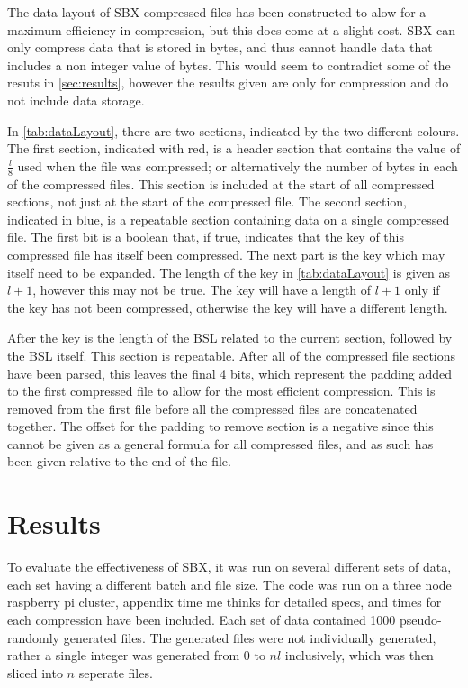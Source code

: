\documentclass{hehe}
\begin{document}
The data layout of SBX compressed files has been constructed to alow for a maximum efficiency in compression, but this does come at a slight cost. SBX can only compress data that is stored in bytes, and thus cannot handle data that includes a non integer value of bytes. This would seem to contradict some of the resuts in \autoref{sec:results}, however the results given are only for compression and do not include data storage.

In \cref{tab:dataLayout}, there are two sections, indicated by the two different colours. The first section, indicated with red, is a header section that contains the value of $\frac{l}{8}$ used when the file was compressed; or alternatively the number of bytes in each of the compressed files. This section is included at the start of all compressed sections, not just at the start of the compressed file. The second section, indicated in blue, is a repeatable section containing data on a single compressed file. The first bit is a boolean that, if true, indicates that the key of this compressed file has itself been compressed. The next part is the key which may itself need to be expanded. The length of the key in \cref{tab:dataLayout} is given as $l+1$, however this may not be true. The key will have a length of $l+1$ only if the key has not been compressed, otherwise the key will have a different length.

After the key is the length of the BSL related to the current section, followed by the BSL itself. This section is repeatable. After all of the compressed file sections have been parsed, this leaves the final 4 bits, which represent the padding added to the first compressed file to allow for the most efficient compression. This is removed from the first file before all the compressed files are concatenated together. The offset for the padding to remove section is a negative since this cannot be given as a general formula for all compressed files, and as such has been given relative to the end of the file.


\section{Results}
\label{sec:results}

To evaluate the effectiveness of SBX, it was run on several different sets of data, each set having a different batch and file size. The code was run on a three node raspberry pi cluster, appendix time me thinks for detailed specs, and times for each compression have been included. Each set of data contained 1000 pseudo-randomly generated files. The generated files were not individually generated, rather a single integer was generated from 0 to $nl$ inclusively, which was then sliced into $n$ seperate files.
\end{document}
